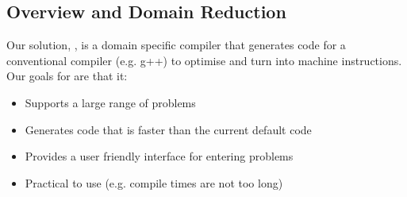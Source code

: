 \newcommand{\vecc}[1]{\vec{\mathbf{#1}}}

\subsection{Overview and Domain Reduction}
Our solution, \phlat, is a domain specific compiler that generates code for a conventional compiler (e.g. g++) to optimise and turn into machine instructions.
Our goals for \phlat are that it:
\begin{itemize}
    \item Supports a large range of problems
    \item Generates code that is faster than the current default code
    \item Provides a user friendly interface for entering problems
    \item Practical to use (e.g. compile times are not too long)
\end{itemize}

